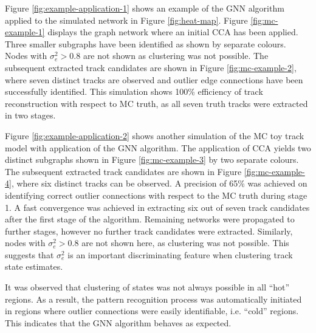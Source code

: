 Figure \ref{fig:example-application-1} shows an example of the GNN algorithm applied to the simulated network in Figure \ref{fig:heat-map}. Figure \ref{fig:mc-example-1} displays the graph network where an initial CCA has been applied. Three smaller subgraphs have been identified as shown by separate colours. Nodes with $\sigma_e^2 > 0.8$ are not shown as clustering was not possible. The subsequent extracted track candidates are shown in Figure \ref{fig:mc-example-2}, where seven distinct tracks are observed and outlier edge connections have been successfully identified. This simulation shows 100\% efficiency of track reconstruction with respect to MC truth, as all seven truth tracks were extracted in two stages. 

Figure \ref{fig:example-application-2} shows another simulation of the MC toy track model with application of the GNN algorithm. The application of CCA yields two distinct subgraphs shown in Figure \ref{fig:mc-example-3} by two separate colours. The subsequent extracted track candidates are shown in Figure \ref{fig:mc-example-4}, where six distinct tracks can be observed. A precision of 65\% was achieved on identifying correct outlier connections with respect to the MC truth during stage 1. A fast convergence was achieved in extracting six out of seven track candidates after the first stage of the algorithm. Remaining networks were propagated to further stages, however no further track candidates were extracted. Similarly, nodes with $\sigma_e^2 > 0.8$ are not shown here, as clustering was not possible. This suggests that $\sigma_{e}^{2}$ is an important discriminating feature when clustering track state estimates. 

It was observed that clustering of states was not always possible in all ``hot'' regions. As a result, the pattern recognition process was automatically initiated in regions where outlier connections were easily identifiable, i.e. ``cold'' regions. This indicates that the GNN algorithm behaves as expected. 


